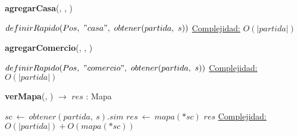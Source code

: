 \begin{Algoritmos}


    \begin{algorithm}[H]{\textbf{agregarCasa}(, , )} %
    \begin{algorithmic}[1]
        \State $definirRapido(Pos,\ "casa",\ obtener(partida,\ s))$
        \medskip
        \Statex \underline{Complejidad:} $O(|partida|)$
    \end{algorithmic}
    \end{algorithm}
    
    \begin{algorithm}[H]{\textbf{agregarComercio}(, , )} %
    \begin{algorithmic}[1]
        \State $definirRapido(Pos,\ "comercio",\ obtener(partida,\ s))$ 
        \medskip
        \Statex \underline{Complejidad:} $O(|partida|)$
    \end{algorithmic}
    \end{algorithm}

    \begin{algorithm}[H]{\textbf{verMapa}(, ) $\to$ $res$ : Mapa}
    \begin{algorithmic}[1]
        \State $sc\ \leftarrow\ obtener(partida,\ s).sim$
        \State $res\ \leftarrow\ mapa(*sc)$ 
        \State \Return $res$
        \medskip
        \Statex \underline{Complejidad:} $O(|partida|) + O(mapa(*sc))$
    \end{algorithmic}
    \end{algorithm}
      

\end{Algoritmos}
